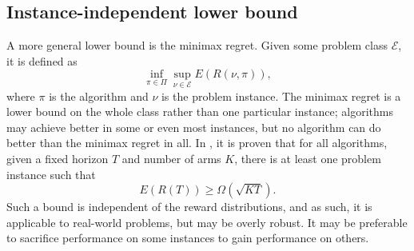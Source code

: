 \subsection{Instance-independent lower bound}
A more general lower bound is the minimax regret.
Given some problem class $\mathcal{E}$, it is defined as
\begin{equation}
    \inf_{\pi \in \Pi} \sup_{\nu \in \mathcal{E}} E(R(\nu, \pi)),
\end{equation}
where $\pi$ is the algorithm and $\nu$ is the problem instance.
The minimax regret is a lower bound on the whole class rather than one particular instance; algorithms may achieve better in some or even most instances, but no algorithm can do better than the minimax regret in all.
In \cite{lattimore2020}, it is proven that for all algorithms, given a fixed horizon $T$ and number of arms $K$, there is at least one problem instance such that
\begin{equation}
    E(R(T)) \geq \Omega(\sqrt{KT}).
\end{equation}
Such a bound is independent of the reward distributions, and as such, it is applicable to real-world problems, but may be overly robust.
It may be preferable to sacrifice performance on some instances to gain performance on others.
